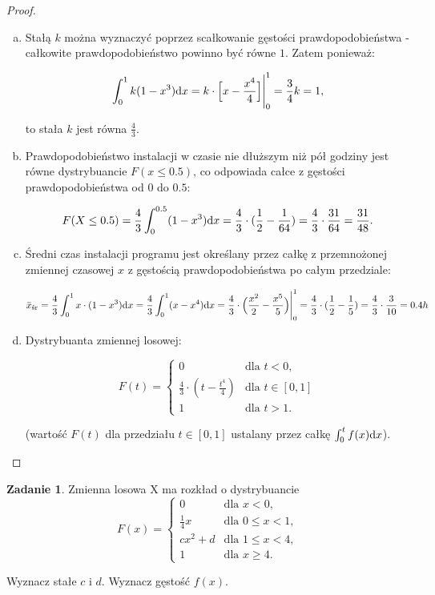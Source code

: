 \documentclass[11pt]{article}
\theoremstyle{definition}
\newtheorem{zadanie}{Zadanie}
\numberwithin{zadanie}{section}
\begin{document}
\begin{proof}

    \begin{enumerate}[(a)]
        \item Stałą $k$ można wyznaczyć poprzez scałkowanie gęstości prawdopodobieństwa - całkowite prawdopodobieństwo powinno być równe $1$. Zatem ponieważ:

              $$\int_0^1k(1-x^3)\text dx = k\cdot\Big[x-\frac{x^4}4\Big]\Bigg|_0^1 = \frac34k = 1,$$

              to stała $k$ jest równa $\frac 43$.

        \item Prawdopodobieństwo instalacji w czasie nie dłuższym niż pół godziny jest równe dystrybuancie $F(x\leq 0.5)$, co odpowiada całce z gęstości prawdopodobieństwa od $0$ do $0.5$:

              $$F(X\leq 0.5)=\frac43\int_0^{0.5}(1-x^3)\text dx = \frac43\cdot(\frac12 - \frac1{64}) = \frac43\cdot\frac{31}{64}=\frac{31}{48}.$$

        \item Średni czas instalacji programu jest określany przez całkę z przemnożonej zmiennej czasowej $x$ z gęstością prawdopodobieństwa po całym przedziale:

              $$\bar x_{\text{śr}} = \frac43\int_0^1x\cdot(1-x^3)\text dx = \frac43\int_0^1(x-x^4)\text dx = \frac43\cdot\Big(\frac{x^2}2 -\frac{x^5}5\Big)\Bigg|_0^1 = \frac43\cdot(\frac12 - \frac15) = \frac43\cdot\frac3{10} = 0.4 h$$

        \item Dystrybuanta zmiennej losowej:

              \[
                  F(t) = \left\{\begin{array}{lr}
                      0                     & \text{dla } t < 0,     \\
                      \frac 43\cdot(t-\frac{t^4}4) & \text{dla } t\in[0, 1] \\
                      1                     & \text{dla } t > 1.
                  \end{array}\right.
              \]

              (wartość $F(t)$ dla przedziału $t\in[0,1]$ ustalany przez całkę $\int_0^tf(x)\text dx$).

    \end{enumerate}
\end{proof}
\begin{zadanie}
    Zmienna losowa X ma rozkład o dystrybuancie
    \[
        F(x) = \left\{\begin{array}{lr}
            0         & \text{dla } x < 0,       \\
            \frac 14x & \text{dla } 0\leq x < 1, \\
            cx^2+d    & \text{dla } 1\leq x < 4, \\
            1         & \text{dla } x\geq 4.
        \end{array}\right.
    \]

    Wyznacz stałe $c$ i $d$. Wyznacz gęstość $f(x)$.
\end{zadanie}
\end{document}
